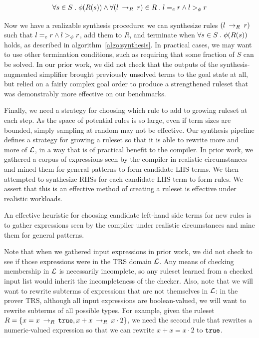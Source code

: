 \begin{align*}
    \forall s \in S \;.\; \phi(R(s)) \wedge \forall (l \:\rightarrow_{R}\: r) \in R \;.\; l =_e r \wedge l >_{\phi} r
\end{align*}

Now we have a realizable synthesis procedure: we can synthesize rules $(l \:\rightarrow_{R}\: r)$ such that $l =_e r \wedge l >_{\phi} r$, add them to $R$, and terminate when $\forall s \in S \;.\; \phi(R(s))$ holds, as described in algorithm~\ref{algo:synthesis}. In practical cases, we may want to use other termination conditions, such as requiring that some fraction of $S$ can be solved. In our prior work, we did not check that the outputs of the synthesis-augmented simplifier brought previously unsolved terms to the goal state at all, but relied on a fairly complex goal order to produce a strengthened ruleset that was demonstrably more effective on our benchmarks.

Finally, we need a strategy for choosing which rule to add to growing ruleset at each step. As the space of potential rules is so large, even if term sizes are bounded, simply sampling at random may not be effective. Our synthesis pipeline defines a strategy for growing a ruleset so that it is able to rewrite more and more of $\mathcal{L}$, in a way that is of practical benefit to the compiler. In prior work, we gathered a corpus of expressions seen by the compiler in realistic circumstances and mined them for general patterns to form candidate LHS terms. We then attempted to synthesize RHSs for each candidate LHS term to form rules. We assert that this is an effective method of creating a ruleset is effective under realistic workloads.

\begin{assumption}
An effective heuristic for choosing candidate left-hand side terms for new rules is to gather expressions seen by the compiler under realistic circumstances and mine them for general patterns.
\end{assumption}

Note that when we gathered input expressions in prior work, we did not check to see if those expressions were in the TRS domain $\mathcal{L}$. Any means of checking membership in $\mathcal{L}$ is necessarily incomplete, so any ruleset learned from a checked input list would inherit the incompleteness of the checker. Also, note that we will want to rewrite subterms of expressions that are not themselves in $\mathcal{L}$: in the prover TRS, although all input expressions are boolean-valued, we will want to rewrite subterms of all possible types. For example, given the ruleset $R = \{x = x \:\rightarrow_{R}\: \texttt{true}, x + x \:\rightarrow_{R}\: x \cdot 2\}$, we need the second rule that rewrites a numeric-valued expression so that we can rewrite $x + x = x \cdot 2$ to $\texttt{true}$.

